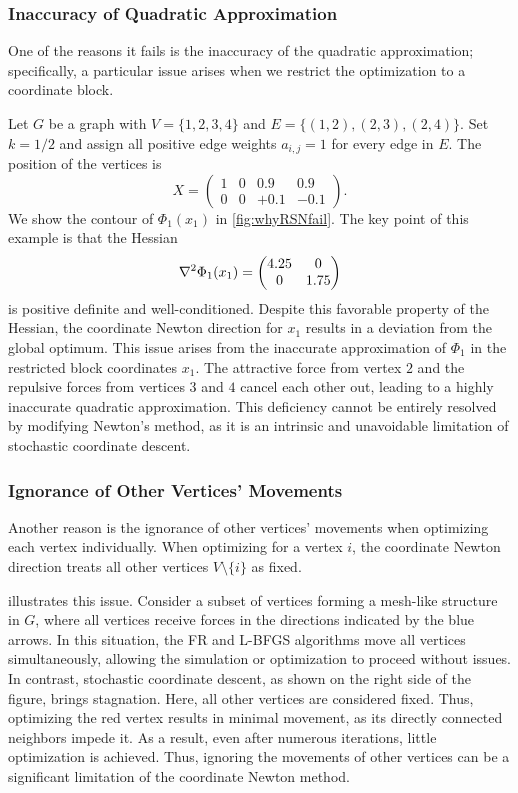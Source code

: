 \documentclass{jgaa-art}
\begin{document}
\subsubsection{Inaccuracy of Quadratic Approximation}
\label{ssec:inaccuracy}

One of the reasons it fails is the inaccuracy of the quadratic approximation; specifically, a particular issue arises when we restrict the optimization to a coordinate block.

Let $G$ be a graph with $V = \{1, 2, 3, 4\}$ and $E = \{(1, 2), (2, 3), (2, 4)\}$.
Set $k = 1/2$ and assign all positive edge weights $a_{i,j}= 1$ for every edge in $E$.
The position of the vertices is
\begin{equation*}
  X =
  \begin{pmatrix}
    1 & 0 & 0.9  & 0.9  \\
    0 & 0 & +0.1 & -0.1
  \end{pmatrix}.
\end{equation*}
We show the contour of $\Phi_{1}(x_{1})$ in \cref{fig:whyRSNfail}.
The key point of this example is that the Hessian
\begin{equation*}
  \nabla^{2}\Phi_{1}(x_{1}) = \mqty(4.25&0 \\
  0&1.75)
\end{equation*}
is positive definite and well-conditioned.
Despite this favorable property of the Hessian, the coordinate Newton direction for $x_{1}$ results in a deviation from the global optimum.
This issue arises from the inaccurate approximation of $\Phi_{1}$ in the restricted block coordinates $x_{1}$.
The attractive force from vertex $2$ and the repulsive forces from vertices $3$ and $4$ cancel each other out, leading to a highly inaccurate quadratic approximation.
This deficiency cannot be entirely resolved by modifying Newton's method, as it is an intrinsic and unavoidable limitation of stochastic coordinate descent.

\subsubsection{Ignorance of Other Vertices' Movements}
\label{ssec:ignorance}

Another reason is the ignorance of other vertices' movements when optimizing each vertex individually.
When optimizing for a vertex $i$, the coordinate Newton direction treats all other vertices $V \setminus \{i\}$ as fixed.

 illustrates this issue.
Consider a subset of vertices forming a mesh-like structure in $G$, where all vertices receive forces in the directions indicated by the blue arrows.
In this situation, the FR and L-BFGS algorithms move all vertices simultaneously, allowing the simulation or optimization to proceed without issues.
In contrast, stochastic coordinate descent, as shown on the right side of the figure, brings stagnation.
Here, all other vertices are considered fixed.
Thus, optimizing the red vertex results in minimal movement, as its directly connected neighbors impede it.
As a result, even after numerous iterations, little optimization is achieved.
Thus, ignoring the movements of other vertices can be a significant limitation of the coordinate Newton method.
\end{document}
